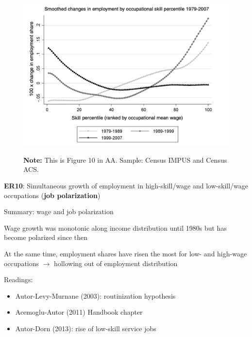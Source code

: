 \documentclass[11pt, aspectratio=169]{beamer}
\newenvironment{witemize}{\itemize\addtolength{\itemsep}{10pt}}{\enditemize}
\begin{document}
\begin{frame}{}
	\vspace{4mm}
	\begin{figure}
		\includegraphics[scale=0.32]{./figures/inequality_polarization_2}
	\vspace*{-2mm}
	\begin{flushleft}
		{\scriptsize \hspace{6mm} \textbf{Note:} This is Figure 10 in AA. Sample: Census IMPUS and Census ACS.}  
	\end{flushleft}	
	\end{figure}

	\vspace{0mm}
	{\color{blue}\textbf{ER10}}: Simultaneous growth of employment in high-skill/wage and low-skill/wage occupations (\textbf{job polarization}) 
\end{frame}


\begin{frame}{Summary: wage and job polarization}

\begin{witemize}
\item Wage growth was monotonic along income distribution until 1980s but has become polarized since then

\item At the same time, employment shares have risen the most for low- and high-wage occupations $\to$ hollowing out of employment distribution 

\item Readings:
\begin{itemize}
	\item Autor-Levy-Murnane (2003): routinization hypothesis
	\item Acemoglu-Autor (2011) Handbook chapter 
	\item Autor-Dorn (2013): rise of low-skill service jobs
\end{itemize}
\end{witemize}
\end{frame}
\end{document}
